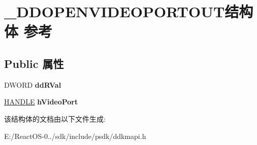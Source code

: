\hypertarget{struct___d_d_o_p_e_n_v_i_d_e_o_p_o_r_t_o_u_t}{}\section{\+\_\+\+D\+D\+O\+P\+E\+N\+V\+I\+D\+E\+O\+P\+O\+R\+T\+O\+U\+T结构体 参考}
\label{struct___d_d_o_p_e_n_v_i_d_e_o_p_o_r_t_o_u_t}
\subsection*{Public 属性}
\begin{DoxyCompactItemize}
\item 
\mbox{\label{struct___d_d_o_p_e_n_v_i_d_e_o_p_o_r_t_o_u_t_ab0a20ff925af3e91735cb379f0a95a6c}} 
D\+W\+O\+RD {\bfseries dd\+R\+Val}
\item 
\mbox{\label{struct___d_d_o_p_e_n_v_i_d_e_o_p_o_r_t_o_u_t_a3be2509476586d54b0136719ce202593}} 
\hyperlink{interfacevoid}{H\+A\+N\+D\+LE} {\bfseries h\+Video\+Port}
\end{DoxyCompactItemize}


该结构体的文档由以下文件生成\+:\begin{DoxyCompactItemize}
\item 
E\+:/\+React\+O\+S-\/0../sdk/include/psdk/ddkmapi.\+h\end{DoxyCompactItemize}
